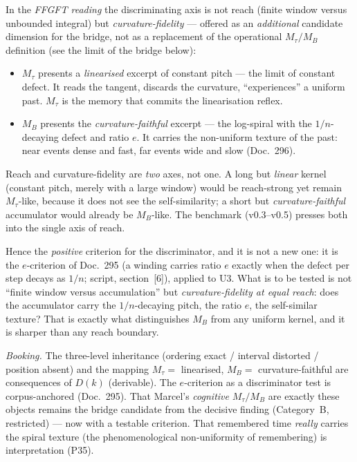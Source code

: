 In the \emph{FFGFT reading} the discriminating axis is not reach (finite window versus
unbounded integral) but \emph{curvature-fidelity} --- offered as an \emph{additional}
candidate dimension for the bridge, not as a replacement of the operational $M_\tau/M_B$
definition (see the limit of the bridge below):
\begin{itemize}
\item $M_\tau$ presents a \emph{linearised} excerpt of constant pitch --- the limit of constant defect. It reads the tangent, discards the curvature, \enquote{experiences} a uniform past.
$M_\tau$ is the memory that commits the linearisation reflex.
\item $M_B$ presents the \emph{curvature-faithful} excerpt --- the log-spiral with the
$1/n$-decaying defect and ratio $e$. It carries the non-uniform texture of the past: near
events dense and fast, far events wide and slow (Doc.~296).
\end{itemize}

Reach and curvature-fidelity are \emph{two} axes, not one. A long but \emph{linear} kernel
(constant pitch, merely with a large window) would be reach-strong yet remain $M_\tau$-like,
because it does not see the self-similarity; a short but \emph{curvature-faithful} accumulator
would already be $M_B$-like. The benchmark (v0.3--v0.5) presses both into the single axis of
reach.

Hence the \emph{positive} criterion for the discriminator, and it is not a new one: it is the
$e$-criterion of Doc.~295 (a winding carries ratio $e$ exactly when the defect per step
decays as $1/n$; script, section~[6]), applied to U3. What is to be tested is not
\enquote{finite window versus accumulation} but \emph{curvature-fidelity at equal reach}: does
the accumulator carry the $1/n$-decaying pitch, the ratio $e$, the self-similar texture? That
is exactly what distinguishes $M_B$ from any uniform kernel, and it is sharper than any reach
boundary.

\emph{Booking.} The three-level inheritance (ordering exact / interval distorted / position
absent) and the mapping $M_\tau=$ linearised, $M_B=$ curvature-faithful are consequences of
$D(k)$ (derivable). The $e$-criterion as a discriminator test is corpus-anchored (Doc.~295).
That Marcel's \emph{cognitive} $M_\tau/M_B$ are exactly these objects remains the bridge candidate from
the decisive finding (Category~B, restricted) --- now with a testable criterion. That
remembered time \emph{really} carries the spiral texture (the phenomenological non-uniformity
of remembering) is interpretation (P35).

